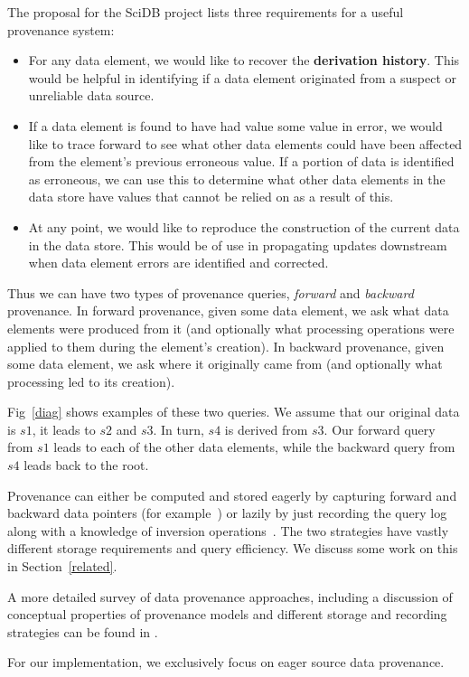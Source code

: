 The proposal for the SciDB project\cite{stonebraker9requirements} lists three requirements for a useful provenance system:

\begin{itemize}
\item For any data element, we would like to recover the \textbf{derivation history}. This would be helpful in identifying if a data element originated from a suspect or unreliable data source.
\item If a data element is found to have had value some value in error, we would like to trace forward to see what other data elements could have been affected from the element's previous erroneous value. If a portion of data is identified as erroneous, we can use this to determine what other data elements in the data store have values that cannot be relied on as a result of this.
\item At any point, we would like to reproduce the construction of the current data in the data store. This would be of use in propagating updates downstream when data element errors are identified and corrected.
\end{itemize}

Thus we can have two types of provenance queries, \textit{forward} and \textit{backward} provenance. In forward provenance, given some data element, we ask what data elements were produced from it (and optionally what processing operations were applied to them during the element's creation). In backward provenance, given some data element, we ask where it originally came from (and optionally what processing led to its creation). 

Fig~\ref{diag} shows examples of these two queries. We assume that our original data is $s1$, it leads to $s2$ and $s3$. In turn, $s4$ is derived from $ s3$. Our forward query from $ s1$ leads to each of the other data elements, while the backward query from  $s4$ leads back to the root. 

Provenance can either be computed and stored eagerly by capturing forward and backward data pointers (for example~\cite{widom2005trio}) or lazily by just recording the query log along with a knowledge of inversion operations~\cite{stonebraker9requirements}. The two strategies have vastly different storage requirements and query efficiency. We discuss some work on this in Section~\ref{related}.

A more detailed survey of data provenance approaches, including a discussion of conceptual properties of provenance models and different storage and recording strategies can be found in \cite{glavic_dataprovenance}. 

For our implementation, we exclusively focus on eager source data provenance. 